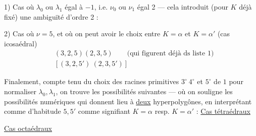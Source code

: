 1) Cas où $\lambda_0$ ou $\lambda_1$  égal à $-1$, i.e. $\nu_0$ ou $\nu_1$ égal 2 --- cela introduit (pour $K$ déjà fixé) une ambiguïté d'ordre 2 :


2) Cas où $\nu=5$, et où on peut avoir le choix entre $K=\alpha$ et $K=\alpha'$ (cas icosaédral)
\[
\begin{aligned}
&(3,2,5)(2,3,5)\qquad\text{(qui figurent déjà ds liste 1)}\\
&[(3,2,5')\ (2,3,5')]
\end{aligned}
\]

Finalement, compte tenu du choix des racines primitives $3^\circ\ 4^\circ$ et $5^\circ$ de $1$ pour normaliser $\lambda_0,\lambda_1$, on trouve les possibilités suivantes --- où on souligne les possibilités numériques qui donnent lieu à \uline{deux} hyperpolygônes, en interprétant comme d'habitude $5,5'$ comme signifiant $K=\alpha$ resp. $K=\alpha'$ :
\uline{Cas tétraédraux}

\uline{Cas octaédraux}

